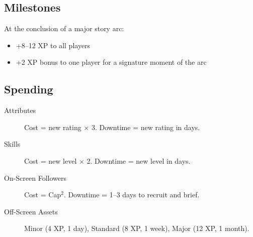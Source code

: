 \subsection{Milestones}

At the conclusion of a major story arc:
\begin{itemize}
\item +8--12 XP to all players
\item +2 XP bonus to one player for a signature moment of the arc
\end{itemize}

\subsection{Spending}

\begin{description}
\item[Attributes] Cost = new rating $\times$ 3. Downtime = new rating in days.
\item[Skills] Cost = new level $\times$ 2. Downtime = new level in days.
\item[On-Screen Followers] Cost = Cap$^2$. Downtime = 1--3 days to recruit and brief.
\item[Off-Screen Assets] Minor (4 XP, 1 day), Standard (8 XP, 1 week), Major (12 XP, 1 month).
\end{description}


